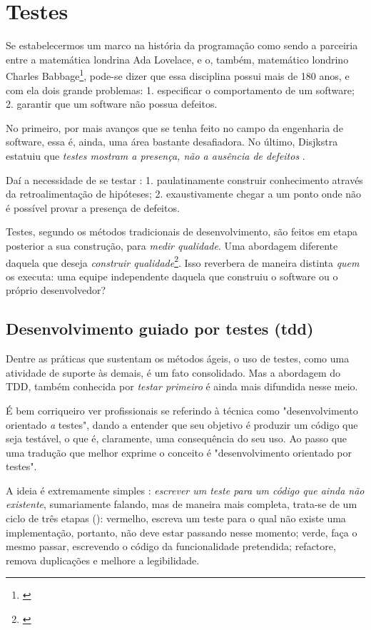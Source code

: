 \section{Testes}

  Se estabelecermos um marco na história da programação como sendo a parceiria entre a matemática londrina Ada Lovelace, e o, também, matemático londrino Charles Babbage\footnote{\cite{Huskey1980}}, pode-se dizer que essa disciplina possui mais de 180 anos, e com ela dois grande problemas: 1. especificar o comportamento de um software; 2. garantir que um software não possua defeitos.

  No primeiro, por mais avanços que se tenha feito no campo da engenharia de software, essa é, ainda, uma área bastante desafiadora. No último, Disjkstra estatuiu que \emph{testes mostram a presença, não a ausência de defeitos} \cite[pág. 16]{Nato1969}.

  Daí a necessidade de se testar \cite[pág. xxix-xxx]{Mezaros2007}: 1. paulatinamente construir conhecimento através da retroalimentação de hipóteses; 2. exaustivamente chegar a um ponto onde não é possível provar a presença de defeitos.

  Testes, segundo os métodos tradicionais de desenvolvimento, são feitos em etapa posterior a sua construção, para \emph{medir qualidade}. Uma abordagem diferente daquela que deseja \emph{construir qualidade}\footnote{ \cite[pág. 7]{FarcicGarcia2015}}. Isso reverbera de maneira distinta \emph{quem} os executa: uma equipe independente daquela que construiu o software ou o próprio desenvolvedor?

  \subsection{Desenvolvimento guiado por testes (tdd)}

    Dentre as práticas que sustentam os métodos ágeis, o uso de testes, como uma atividade de suporte às demais, é um fato consolidado. Mas a abordagem do TDD, também conhecida por \emph{testar primeiro} é ainda mais difundida nesse  meio.

    É bem corriqueiro ver profissionais se referindo à  técnica como "desenvolvimento orientado \emph{a} testes", dando a entender que seu objetivo é produzir um código que seja testável, o que é, claramente, uma consequência do seu uso. Ao passo que uma tradução que melhor exprime o conceito é "desenvolvimento orientado {por} testes".

    A ideia é extremamente simples \cite[p.1]{FreemanPryce2009}: \emph{escrever um teste para um código que ainda não existente}, sumariamente falando, mas de maneira mais completa, trata-se de um ciclo de três etapas\cite[pág. x] {Beck2003} (): vermelho,  escreva um teste para o qual não existe uma implementação, portanto, não deve estar passando nesse momento; verde, faça o mesmo passar, escrevendo o código da funcionalidade pretendida; refactore, remova duplicações e melhore a legibilidade.

